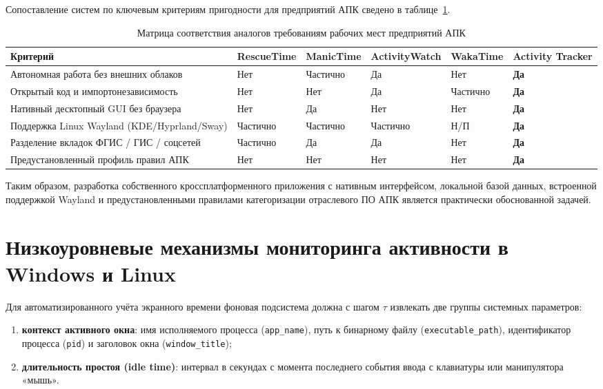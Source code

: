 \documentclass{timcw}
\begin{document}
Сопоставление систем по ключевым критериям пригодности для предприятий АПК сведено в таблице~\ref{tab:criteria_matrix}.

\begin{table}[H]
\centering
\caption{Матрица соответствия аналогов требованиям рабочих мест предприятий АПК}
\label{tab:criteria_matrix}
\footnotesize
\begin{tabularx}{\textwidth}{>{\raggedright\arraybackslash}X >{\centering\arraybackslash}p{1.8cm} >{\centering\arraybackslash}p{1.8cm} >{\centering\arraybackslash}p{2.0cm} >{\centering\arraybackslash}p{1.8cm} >{\centering\arraybackslash}p{2.1cm}}
\toprule
\textbf{Критерий} & \textbf{RescueTime} & \textbf{ManicTime} & \textbf{ActivityWatch} & \textbf{WakaTime} & \textbf{Activity Tracker} \\
\midrule
Автономная работа без внешних облаков & Нет & Частично & Да & Нет & \textbf{Да} \\
Открытый код и импортонезависимость & Нет & Нет & Да & Частично & \textbf{Да} \\
Нативный десктопный GUI без браузера & Нет & Да & Нет & Нет & \textbf{Да} \\
Поддержка Linux Wayland (KDE/Hyprland/Sway) & Частично & Частично & Частично & Н/П & \textbf{Да} \\
Разделение вкладок ФГИС / ГИС / соцсетей & Частично & Да & Да & Нет & \textbf{Да} \\
Предустановленный профиль правил АПК & Нет & Нет & Нет & Нет & \textbf{Да} \\
\bottomrule
\end{tabularx}
\end{table}

Таким образом, разработка собственного кроссплатформенного приложения с нативным интерфейсом, локальной базой данных, встроенной поддержкой Wayland и предустановленными правилами категоризации отраслевого ПО АПК является практически обоснованной задачей.

\section{Низкоуровневые механизмы мониторинга активности в Windows и Linux}

Для автоматизированного учёта экранного времени фоновая подсистема должна с шагом $\tau$ извлекать две группы системных параметров:
\begin{enumerate}
  \item \textbf{контекст активного окна}: имя исполняемого процесса (\texttt{app\_name}), путь к бинарному файлу (\texttt{executable\_path}), идентификатор процесса (\texttt{pid}) и заголовок окна (\texttt{window\_title});
  \item \textbf{длительность простоя (idle time)}: интервал в секундах с момента последнего события ввода с клавиатуры или манипулятора «мышь».
\end{enumerate}
\end{document}
